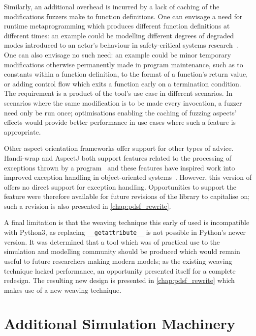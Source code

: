 Similarly, an additional overhead is incurred by a lack of caching of the
modifications fuzzers make to function definitions. One can envisage a need for
runtime metaprogramming which produces different function definitions at
different times: an example could be modelling different degrees of degraded
modes introduced to an actor's behaviour in safety-critical systems
research~\cite{johnson2007degradedmodes}. One can also envisage no such need: an
example could be minor temporary modifications otherwise permanently made in
program maintenance, such as to constants within a function definition, to the
format of a function's return value, or adding control flow which exits a
function early on a termination condition. The requirement is a product of the
tool's use case in different scenarios. In scenarios where the same modification
is to be made every invocation, a fuzzer need only be run once; optimisations
enabling the caching of fuzzing aspects' effects would provide better
performance in use cases where such a feature is appropriate.

Other aspect orientation frameworks offer support for other types of advice.
Handi-wrap and AspectJ both support features related to the processing of
exceptions thrown by a program~\cite{Baker_2002,aspectj_intro} and these
features have inspired work into improved exception handling in object-oriented
systems~\cite{millham2011aopandoopsecurity}. However, this version of \pdsf
offers no direct support for exception handling. Opportunities to support the
feature were therefore available for future revisions of the library to
capitalise on; such a revision is also presented in \cref{chap:pdsf_rewrite}.

A final limitation is that the weaving technique this early of \pdsf used is
incompatible with Python3, as replacing \lstinline{__getattribute__} is not
possible in Python's newer version. It was determined that a tool which was of
practical use to the simulation and modelling community should be produced which
would remain useful to future researchers making modern models; as the existing
weaving technique lacked performance, an opportunity presented itself for a
complete redesign. The resulting new design is presented in
\cref{chap:pdsf_rewrite} which makes use of a new weaving technique.



\section{Additional Simulation Machinery}\label{sec:prior_work_machinery}


